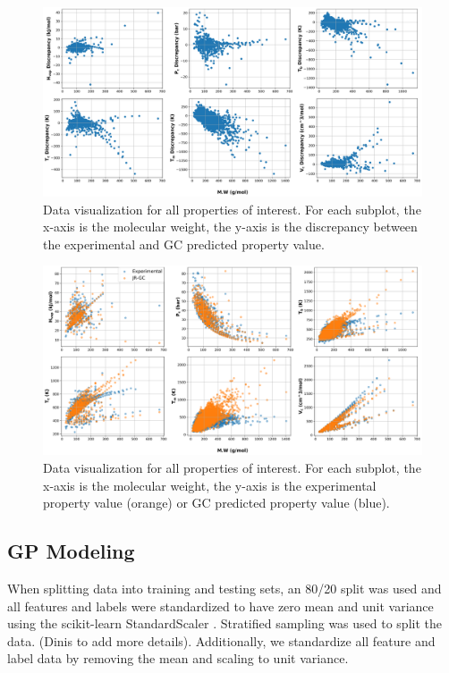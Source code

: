 \documentclass[journal=jacsat,manuscript=article]{achemso}
\begin{document}
\begin{figure}[H]
    \centering
    \includegraphics[width=\textwidth]{"./MW_vs_Disc.png"} %
    \caption{Data visualization for all properties of interest. For each subplot, the x-axis is the molecular weight, the y-axis is the discrepancy between the experimental and GC predicted property value.}
    \label{fig:Data_Vis_Disc}
\end{figure}

\begin{figure}[H] %
    \centering
    \includegraphics[width=\textwidth]{"./MW_vs_Prop.png"} %
    \caption{Data visualization for all properties of interest. For each subplot, the x-axis is the molecular weight, the y-axis is the experimental property value (orange) or GC predicted property value (blue).}
    \label{fig:Data_Vis_Prop}
\end{figure}



\subsection{GP Modeling}
When splitting data into training and testing sets, an 80/20 split was used and all features and labels were standardized to have zero mean and unit variance using the scikit-learn StandardScaler \cite{scikit-learn} . Stratified sampling was used to split the data. (Dinis to add more details). Additionally, we standardize all feature and label data by removing the mean and scaling to unit variance.
\end{document}
